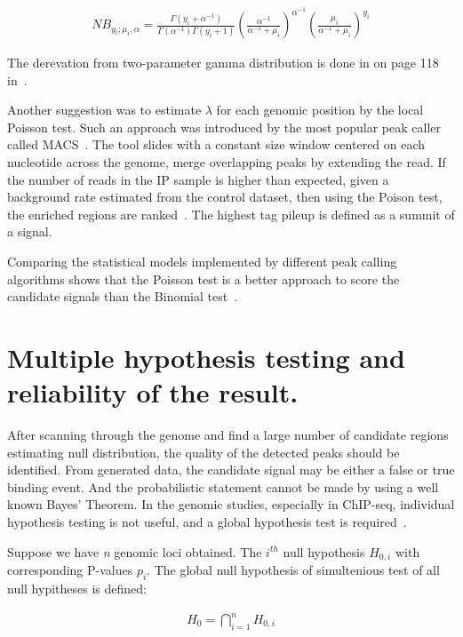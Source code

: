\begin{align*}
    NB_{y_i; \mu _i, \alpha} = \frac{\Gamma (y_i + \alpha ^{-1})}{\Gamma(\alpha ^{-1})\Gamma(y_i + 1)} \left(\frac{\alpha ^{-1}}{\alpha ^{-1} + \mu_i}\right) ^{\alpha ^{-1}} \left(\frac{ \mu _i}{ \alpha ^{-1} + \mu _i}\right) ^{y _i}
\end{align*}

The derevation from two-parameter gamma distribution is done in on page 118 in~\cite[Cameron and Trivedi (2013)]{cameron2013regression}.

Another suggestion was to estimate $\lambda$ for each genomic position by the local Poisson test. 
Such an approach was introduced by the most popular peak caller called MACS~\cite{zhang2008model}.
The tool slides with a constant size window centered on each nucleotide across the genome, merge overlapping peaks by extending the read.
If the number of reads in the IP sample is higher than expected, given a background rate estimated from the control dataset, then using the Poison test, the enriched regions are ranked~\cite{thomas2017features}. 
The highest tag pileup is defined as a summit of a signal.  

Comparing the statistical models implemented by different peak calling algorithms shows that the Poisson test is a better approach to score the candidate signals than the Binomial test~\cite{thomas2017features}.

\section{Multiple hypothesis testing and reliability of the result.}

After scanning through the genome and find a large number of candidate regions estimating null distribution, the quality of the detected peaks should be identified. 
From generated data, the candidate signal may be either a false or true binding event. 
And the probabilistic statement cannot be made by using a well known Bayes' Theorem. 
In the genomic studies, especially in ChIP-seq, individual hypothesis testing is not useful, and a global hypothesis test is required~\cite{futschik2019omnibus}. 

Suppose we have \textit{n} genomic loci obtained.
The $i^{th}$ null hypothesis $H_{0,i}$ with corresponding P-values $p_i$.
The global null hypothesis of simultenious test of all null hypitheses  is defined:

\begin{align*}
    H_0 = \displaystyle\bigcap_{i=1}^{n} H_{0, i}
\end{align*}

